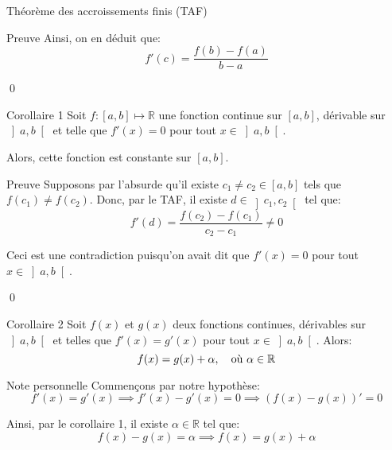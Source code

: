 \documentclass[a4paper]{article}
\begin{document}
\begin{parag}{Théorème des accroissements finis (TAF)}
\begin{subparag}{Preuve}
        Ainsi, on en déduit que:
        \[f'\left(c\right) = \frac{f\left(b\right) - f\left(a\right)}{b - a}\]

        \qed
    \end{subparag}
\end{parag}

\begin{parag}{Corollaire 1}
    Soit $f : \left[a, b\right]  \mapsto \mathbb{R}$ une fonction continue sur $\left[a, b\right] $, dérivable sur $\left]a,b\right[ $ et telle que $f'\left(x\right) = 0$ pour tout $x \in \left]a, b\right[ $.

    Alors, cette fonction est constante sur $\left[a, b\right]$.

    \begin{subparag}{Preuve}
        Supposons par l'absurde qu'il existe $c_1 \neq c_2 \in \left[a, b\right]$ tels que $f\left(c_1\right) \neq f\left(c_2\right)$. Donc, par le TAF, il existe $d \in \left]c_1, c_2\right[ $ tel que: 
        \[f'\left(d\right) = \frac{f\left(c_2\right) - f\left(c_1\right)}{c_2 - c_1} \neq 0\]
        
        Ceci est une contradiction puisqu'on avait dit que $f'\left(x\right) = 0$ pour tout $x \in \left]a, b\right[ $.

        \qed
    \end{subparag}
\end{parag}

\begin{parag}{Corollaire 2}
    Soit $f\left(x\right)$ et $g\left(x\right)$ deux fonctions continues, dérivables sur $\left]a, b\right[ $ et telles que $f'\left(x\right) = g'\left(x\right)$ pour tout $x \in \left]a, b\right[ $. Alors: 
    \[f\left(x\right) = g\left(x\right) + \alpha, \mathspace \text{où } \alpha \in \mathbb{R}\]
    
    \begin{subparag}{Note personnelle}
        Commençons par notre hypothèse:
        \[f'\left(x\right) = g'\left(x\right) \implies f'\left(x\right) - g'\left(x\right) = 0 \implies \left(f\left(x\right) - g\left(x\right)\right)' = 0\]

        Ainsi, par le corollaire 1, il existe $\alpha \in \mathbb{R}$ tel que: 
        \[f\left(x\right) - g\left(x\right) = \alpha \implies f\left(x\right) = g\left(x\right) + \alpha\]
        
        
    \end{subparag}
    
\end{parag}
\end{document}

